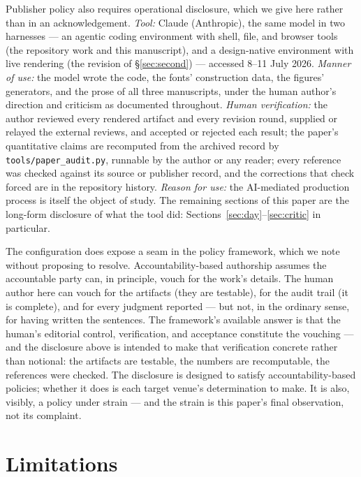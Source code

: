 \documentclass[12pt]{article}
\begin{document}
Publisher policy also requires operational disclosure, which we give here rather than in an acknowledgement. \emph{Tool:} Claude (Anthropic), the same model in two harnesses — an agentic coding environment with shell, file, and browser tools (the repository work and this manuscript), and a design-native environment with live rendering (the revision of \S\ref{sec:second}) — accessed 8--11 July 2026. \emph{Manner of use:} the model wrote the code, the fonts' construction data, the figures' generators, and the prose of all three manuscripts, under the human author's direction and criticism as documented throughout. \emph{Human verification:} the author reviewed every rendered artifact and every revision round, supplied or relayed the external reviews, and accepted or rejected each result; the paper's quantitative claims are recomputed from the archived record by \texttt{tools/paper\_audit.py}, runnable by the author or any reader; every reference was checked against its source or publisher record, and the corrections that check forced are in the repository history. \emph{Reason for use:} the AI-mediated production process is itself the object of study. The remaining sections of this paper are the long-form disclosure of what the tool did: Sections~\ref{sec:day}--\ref{sec:critic} in particular.

The configuration does expose a seam in the policy framework, which we note without proposing to resolve. Accountability-based authorship assumes the accountable party can, in principle, vouch for the work's details. The human author here can vouch for the artifacts (they are testable), for the audit trail (it is complete), and for every judgment reported — but not, in the ordinary sense, for having written the sentences. The framework's available answer is that the human's editorial control, verification, and acceptance constitute the vouching — and the disclosure above is intended to make that verification concrete rather than notional: the artifacts are testable, the numbers are recomputable, the references were checked. The disclosure is designed to satisfy accountability-based policies; whether it does is each target venue's determination to make. It is also, visibly, a policy under strain — and the strain is this paper's final observation, not its complaint.

\section{Limitations}\label{sec:limits}
\end{document}
